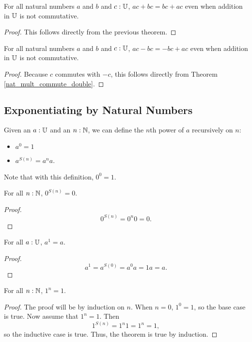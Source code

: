 \documentclass[../../math.tex]{subfiles}
\begin{document}
\begin{theorem} \label{nat_mult_commute}
    For all natural numbers $a$ and $b$ and $c : \mathbb{U}$, $ac + bc = bc + ac$ even
    when addition in $\mathbb{U}$ is not commutative.
\end{theorem}
\begin{proof}
    This follows directly from the previous theorem.
\end{proof}

\begin{theorem} \label{nat_mult_commute_neg}
    For all natural numbers $a$ and $b$ and $c : \mathbb{U}$, $ac - bc = -bc + ac$ even
    when addition in $\mathbb{U}$ is not commutative.
\end{theorem}
\begin{proof}
    Because $c$ commutes with $-c$, this follows directly from Theorem
    \ref{nat_mult_commute_double}.
\end{proof}

\subsection{Exponentiating by Natural Numbers}

\begin{definition}
    Given an $a : \mathbb{U}$ and an $n : \mathbb{N}$, we can define the $n$th power of $a$
    recursively on $n$:
    \begin{itemize}
        \item $a^0 = 1$
        \item $a^{S(n)} = a^na$.
    \end{itemize}
    Note that with this definition, $0^0 = 1$.
\end{definition}

\begin{theorem}
    For all $n : \mathbb{N}$, $0^{S(n)} = 0$.
\end{theorem}
\begin{proof}
    \[
        0^{S(n)} = 0^n0 = 0.
    \]
\end{proof}

\begin{theorem}
    For all $a : \mathbb{U}$, $a^1 = a$.
\end{theorem}
\begin{proof}
    \[
        a^1 = a^{S(0)} = a^0a = 1a = a.
    \]
\end{proof}

\begin{theorem}
    For all $n : \mathbb{N}$, $1^n = 1$.
\end{theorem}
\begin{proof}
    The proof will be by induction on $n$.  When $n = 0$, $1^0 = 1$, so the base
    case is true.  Now assume that $1^n = 1$.  Then
    \[
        1^{S(n)} = 1^n1 = 1^n = 1,
    \]
    so the inductive case is true.  Thus, the theorem is true by induction.
\end{proof}
\end{document}
